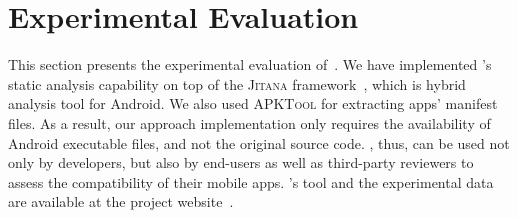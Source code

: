 \def \apitotalALL {68,268}
\def \apctotalALL {2,115}

\def \apicountALL {1,471}
\def \apiprcntALL {41.19\%}
\def \apicountZOO {878}
\def \apicountFDR {593}

\def \apccountALL {761}
\def \apcprcntALL {20.05\%}
\def \apccountZOO {464}
\def \apccountFDR {252}

\def \andzooct {2,180}
\def \fdroidct {1,391}

\def \prqcount {224}
\def \prqprcnt {12.34\%}
\def \prqtotal {1,815}

\def \prvcount {1,206}
\def \prvprcnt {68.68\%}
\def \prvtotal {1,756}

\def \prmcount {1,430}
\def \prmprcnt {40.04\%}

\def \rqoneapps {19}

\section{Experimental Evaluation}
\label{sec-eval}

This section presents the experimental evaluation of~\@approach. 
We have implemented \@approach's static analysis capability on top of the \textsc{Jitana} framework~\cite{tsutano2017efficient}, %
which is hybrid analysis tool for Android.
We also used \textsc{APKTool} \cite{apktool} for %
extracting apps' manifest files.
As a result, our approach implementation only requires the availability of Android executable files, and not the original source code. \@approach, thus, can be used not only by developers, but also by end-users as well as third-party reviewers to assess the compatibility of their mobile apps.
\@approach's tool and the experimental data are available at the project website~\cite{GainDroid}.

